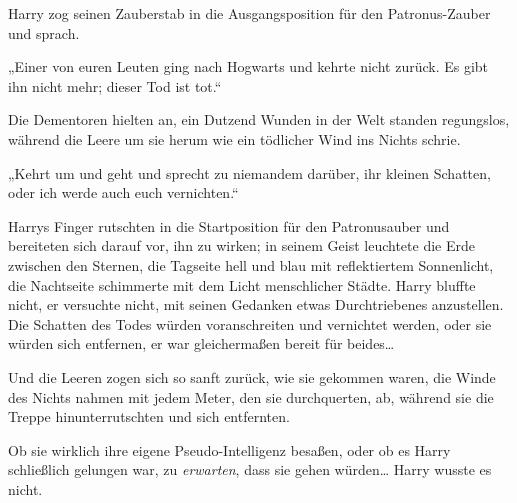 Harry zog seinen Zauberstab in die Ausgangsposition für den Patronus-Zauber und sprach.

„Einer von euren Leuten ging nach Hogwarts und kehrte nicht zurück. Es gibt ihn nicht mehr; dieser Tod ist tot.“

Die Dementoren hielten an, ein Dutzend Wunden in der Welt standen regungslos, während die Leere um sie herum wie ein tödlicher Wind ins Nichts schrie.

„Kehrt um und geht und sprecht zu niemandem darüber, ihr kleinen Schatten, oder ich werde auch euch vernichten.“

Harrys Finger rutschten in die Startposition für den Patronusauber und bereiteten sich darauf vor, ihn zu wirken; in seinem Geist leuchtete die Erde zwischen den Sternen, die Tagseite hell und blau mit reflektiertem Sonnenlicht, die Nachtseite schimmerte mit dem Licht menschlicher Städte. Harry bluffte nicht, er versuchte nicht, mit seinen Gedanken etwas Durchtriebenes anzustellen. Die Schatten des Todes würden voranschreiten und vernichtet werden, oder sie würden sich entfernen, er war gleichermaßen bereit für beides…

Und die Leeren zogen sich so sanft zurück, wie sie gekommen waren, die Winde des Nichts nahmen mit jedem Meter, den sie durchquerten, ab, während sie die Treppe hinunterrutschten und sich entfernten.

Ob sie wirklich ihre eigene Pseudo-Intelligenz besaßen, oder ob es Harry schließlich gelungen war, zu \emph{erwarten}, dass sie gehen würden… Harry wusste es nicht.

